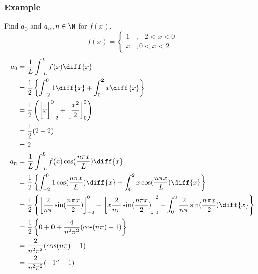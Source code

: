\documentclass{math}
\begin{document}
\subsubsection*{Example}
Find \( a_0 \) and \( a_n, n\in\N \) for \( f(x) \).
\[ f(x) = \begin{cases}
  1 &, -2<x<0 \\
  x &, 0<x<2
\end{cases} \]
\begin{align*}
  a_0 &= \frac{1}{L}\int_{-L}^{L}f(x)\diff{x} \\
  &= \frac{1}{2}\left\{\int_{-2}^{0}1\diff{x}+\int_{0}^{2}x\diff{x}\right\} \\
  &= \frac{1}{2}\left(\bigg[x\bigg]_{-2}^{0}+
    \bigg[\frac{x^2}{2}\bigg]_0^2\right) \\
  &= \frac{1}{2}(2+2) \\
  &= 2 \\
  a_n &= \frac{1}{L}\int_{-L}^{L}f(x)\cos(\frac{n\pi x}{L})\diff{x} \\
  &= \frac{1}{2}\left\{\int_{-2}^{0}1\cos(\frac{n\pi x}{L})\diff{x}+
    \int_{0}^{2}x\cos(\frac{n\pi x}{L})\diff{x}\right\} \\
  &= \frac{1}{2}\left\{\bigg[\frac{2}{n\pi}\sin(\frac{n\pi x}{2})\bigg]_{-2}^0+
    \bigg[x\frac{2}{n\pi}\sin(\frac{n\pi x}{2})\bigg]_0^2-
    \int_0^2\frac{2}{n\pi}\sin(\frac{n\pi x}{2})\diff{x}\right\} \\
  &= \frac{1}{2}\left\{0+0+\frac{4}{n^2\pi^2}(\cos(n\pi)-1)\right\} \\
  &= \frac{2}{n^2\pi^2}(cos(n\pi)-1) \\
  &= \frac{2}{n^2\pi^2}(-1^n-1)
\end{align*}
\end{document}

